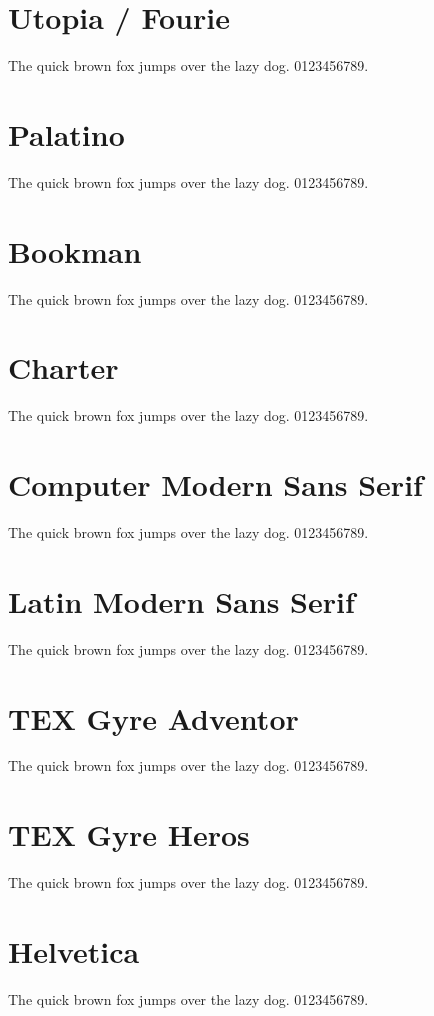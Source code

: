 \documentclass{article}
\begin{document}
\section{Utopia / Fourie}
{   \selectfont The quick brown fox jumps over the lazy dog. 0123456789.}

\section{Palatino}
{   \selectfont The quick brown fox jumps over the lazy dog. 0123456789.}

\section{Bookman}
{   \selectfont The quick brown fox jumps over the lazy dog. 0123456789.}

\section{Charter}
{   \selectfont The quick brown fox jumps over the lazy dog. 0123456789.}

\section{Computer Modern Sans Serif}
{  \selectfont The quick brown fox jumps over the lazy dog. 0123456789.}

\section{Latin Modern Sans Serif}
{  \selectfont The quick brown fox jumps over the lazy dog. 0123456789.}

\section{TEX Gyre Adventor}
{   \selectfont The quick brown fox jumps over the lazy dog. 0123456789.}

\section{TEX Gyre Heros}
{   \selectfont The quick brown fox jumps over the lazy dog. 0123456789.}

\section{Helvetica}
{   \selectfont The quick brown fox jumps over the lazy dog. 0123456789.}
\end{document}
